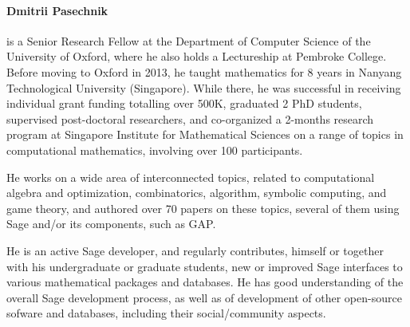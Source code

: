 \paragraph{Dmitrii Pasechnik}

%

%


is a Senior Research Fellow at the Department of Computer Science
of  the University of Oxford, where he also holds a Lectureship
at Pembroke College. Before moving to Oxford in 2013, he taught mathematics for 8
years in Nanyang Technological University (Singapore). While there, he
was successful in receiving individual grant funding totalling over 500K, 
graduated 2 PhD students, supervised post-doctoral researchers, 
and co-organized a 2-months research program
at Singapore Institute for Mathematical Sciences
on a range of topics in computational mathematics, involving over 100 participants. 

He works on a wide area of interconnected topics, related to computational algebra
and optimization, combinatorics, algorithm, symbolic computing, and game theory, and authored over
70 papers on these topics, several of them using Sage and/or its components, such as GAP.

He is an active Sage developer, and regularly contributes, himself or together
with his undergraduate or graduate students, new or improved Sage interfaces to
various mathematical packages and databases.
He has good understanding of the overall Sage development process, as well as 
of development of other open-source sofware and databases, including their
social/community aspects. 
